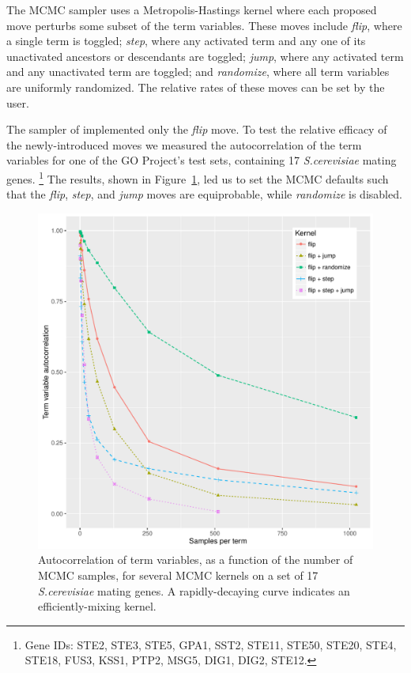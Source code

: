 The MCMC sampler uses a Metropolis-Hastings kernel where each proposed move perturbs some subset of the term variables.
These moves include {\em flip}, where a single term is toggled;
{\em step}, where any activated term and any one of its unactivated ancestors or descendants are toggled;
{\em jump}, where any activated term and any unactivated term are toggled; and
{\em randomize}, where all term variables are uniformly randomized.
The relative rates of these moves can be set by the user.

The sampler of \cite{pmid20172960} implemented only the {\em flip} move.
To test the relative efficacy of the newly-introduced moves we measured the autocorrelation of the term variables
for one of the GO Project's test sets, containing 17 {\em S.cerevisiae} mating genes.
\footnote{Gene IDs: STE2, STE3, STE5, GPA1, SST2, STE11, STE50, STE20, STE4, STE18, FUS3, KSS1, PTP2, MSG5, DIG1, DIG2, STE12.}
The results, shown in Figure~\ref{fig:termauto}, led us to set the MCMC defaults such that
the {\em flip}, {\em step}, and {\em jump} moves are equiprobable,
while {\em randomize} is disabled.

\begin{figure}
\includegraphics[width=\columnwidth]{termAutoCorrelation}
\caption{
  \label{fig:termauto}
  Autocorrelation of term variables, as a function of the number of MCMC samples, for several MCMC kernels on a set of 17 {\em S.cerevisiae} mating genes.
  A rapidly-decaying curve indicates an efficiently-mixing kernel.
}
\end{figure}

